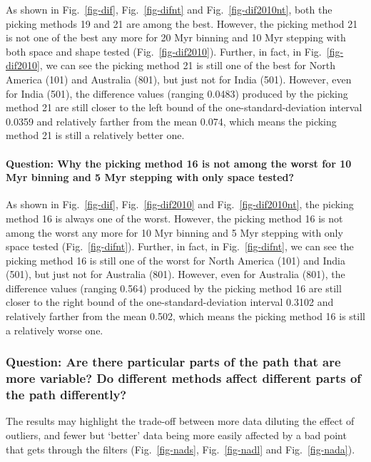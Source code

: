 As shown in Fig.~\ref{fig-dif}, Fig.~\ref{fig-difnt} and
Fig.~\ref{fig-dif2010nt}, both the picking methods 19 and 21 are among the
best. However, the picking method 21 is not one of the best any more for 20 Myr
binning and 10 Myr stepping with both space and shape tested
(Fig.~\ref{fig-dif2010}). Further, in fact, in Fig.~\ref{fig-dif2010}, we can
see the picking method 21 is still one of the best for North America (101) and
Australia (801), but just not for India (501). However, even for India (501),
the difference values (ranging 0.0483) produced by the picking
method 21 are still closer to the left bound of the one-standard-deviation
interval 0.0359 and relatively farther from the mean 0.074,
which means the picking method 21 is still a relatively better one.

\paragraph{Question: Why the picking method 16 is not among the worst for 10 Myr
binning and 5 Myr stepping with only space tested?}

As shown in Fig.~\ref{fig-dif}, Fig.~\ref{fig-dif2010} and
Fig.~\ref{fig-dif2010nt}, the picking method 16 is always one of the worst.
However, the picking method 16 is not among the worst any more for 10 Myr
binning and 5 Myr stepping with only space tested (Fig.~\ref{fig-difnt}).
Further, in fact, in Fig.~\ref{fig-difnt}, we can see the picking method 16 is
still one of the worst for North America (101) and India (501), but just not for
Australia (801). However, even for Australia (801), the difference values
(ranging 0.564) produced by the picking method 16 are still
closer to the right bound of the one-standard-deviation interval
0.3102 and relatively farther from the mean 0.502, which means
the picking method 16 is still a relatively worse one.

\subsubsection{Question: Are there particular parts of the path that are more
variable? Do different methods affect different parts of the path differently?}

The results may highlight the trade-off between more data diluting the effect of
outliers, and fewer but `better' data being more easily affected by a bad point
that gets through the filters (Fig.~\ref{fig-nads}, Fig.~\ref{fig-nadl} and
Fig.~\ref{fig-nada}).

